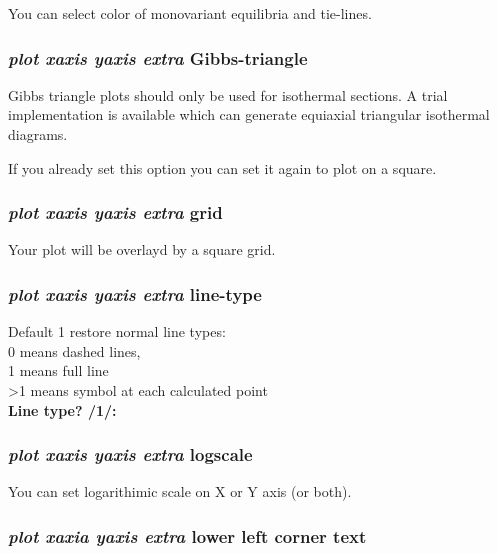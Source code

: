 \documentclass[11pt]{article}
\begin{document}
You can select color of monovariant equilibria and tie-lines.

\hypertarget{Plot Gibbs triangle}{}
\subsubsection{{\em plot xaxis yaxis extra} Gibbs-triangle}

Gibbs triangle plots should only be used for isothermal sections.  A
trial implementation is available which can generate equiaxial
triangular isothermal diagrams.

If you already set this option you can set it again to plot on a square.

\hypertarget{Plot grid}{}
\subsubsection{{\em plot xaxis yaxis extra} grid}

Your plot will be overlayd by a square grid.

\hypertarget{Plot line type}{}
\hypertarget{Plot line symbols}{}
\subsubsection{{\em plot xaxis yaxis extra} line-type}

Default 1 restore normal line types:\\
 0 means dashed lines,\\
 1 means full line\\
>1 means symbol at each calculated point\\

{\bf Line type? /1/:}

\hypertarget{Plot logax}{}
\subsubsection{{\em plot xaxis yaxis extra} logscale}

You can set logarithimic scale on X or Y axis (or both).

\hypertarget{Extra lower-left-corner}{}
\subsubsection{{\em plot xaxia yaxis extra} lower left corner text}
\end{document}
